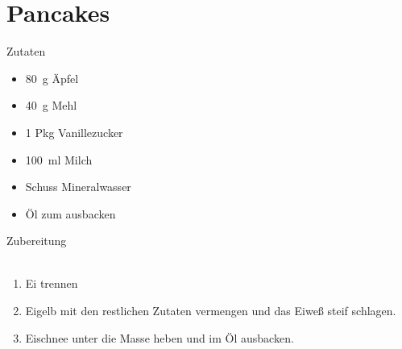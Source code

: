 \section*{Pancakes}
\ihead{}\ohead{}
\cfoot{}
{\Large Zutaten}
\begin{multicols}{2}
\begin{itemize}
    \item \SI{80}{g} Äpfel
    \item \SI{40}{g} Mehl
    \item \num{1} Pkg Vanillezucker
    \item \SI{100}{ml} Milch
    \item Schuss Mineralwasser
    \item Öl zum ausbacken
\end{itemize}
\end{multicols}
\noindent
{\Large Zubereitung}\\
\\
\begin{enumerate}
    \item Ei trennen
    \item Eigelb mit den restlichen Zutaten vermengen und das Eiweß steif schlagen.
    \item Eischnee unter die Masse heben und im Öl ausbacken.
\end{enumerate}